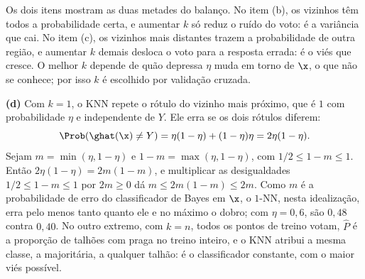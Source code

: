 \begin{solucao}
Os dois itens mostram as duas metades do balanço. No item (b), os vizinhos têm todos a
probabilidade certa, e aumentar $k$ só reduz o ruído do voto: é a variância que cai. No item
(c), os vizinhos mais distantes trazem a probabilidade de outra região, e aumentar $k$ demais
desloca o voto para a resposta errada: é o viés que cresce. O melhor $k$ depende de quão
depressa $\eta$ muda em torno de $\x$, o que não se conhece; por isso $k$ é escolhido por
validação cruzada.

\smallskip
\textbf{(d)} Com $k=1$, o KNN repete o rótulo do vizinho mais próximo, que é $1$ com
probabilidade $\eta$ e independente de $Y$. Ele erra se os dois rótulos diferem:
\[
  \Prob(\ghat(\x)\ne Y)=\eta(1-\eta)+(1-\eta)\eta=2\eta(1-\eta) .
\]
Sejam $m=\min(\eta,1-\eta)$ e $1-m=\max(\eta,1-\eta)$, com $1/2\le1-m\le1$. Então
$2\eta(1-\eta)=2m(1-m)$, e multiplicar as desigualdades $1/2\le1-m\le1$ por $2m\ge0$ dá
$m\le2m(1-m)\le2m$. Como $m$ é a probabilidade de erro do classificador de Bayes em $\x$, o
$1$-NN, nesta idealização, erra pelo menos tanto quanto ele e no máximo o dobro; com
$\eta=0{,}6$, são $0{,}48$ contra $0{,}40$. No outro extremo, com $k=n$, todos os pontos de treino
votam, $\widehat P$ é a proporção de talhões com praga no treino inteiro, e o KNN atribui a
mesma classe, a majoritária, a qualquer talhão: é o classificador constante, com o maior viés
possível.
\end{solucao}

